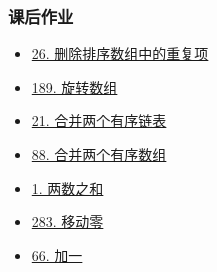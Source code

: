 \subsubsection{课后作业}

\begin{itemize}
  \item \hyperref[leetcode:26]{26. 删除排序数组中的重复项}
  \item \hyperref[leetcode:189]{189. 旋转数组}
  \item \hyperref[leetcode:21]{21. 合并两个有序链表}
  \item \hyperref[leetcode:88]{88. 合并两个有序数组}
  \item \hyperref[leetcode:1]{1. 两数之和}
  \item \hyperref[leetcode:283]{283. 移动零}
  \item \hyperref[leetcode:66]{66. 加一}
\end{itemize}
